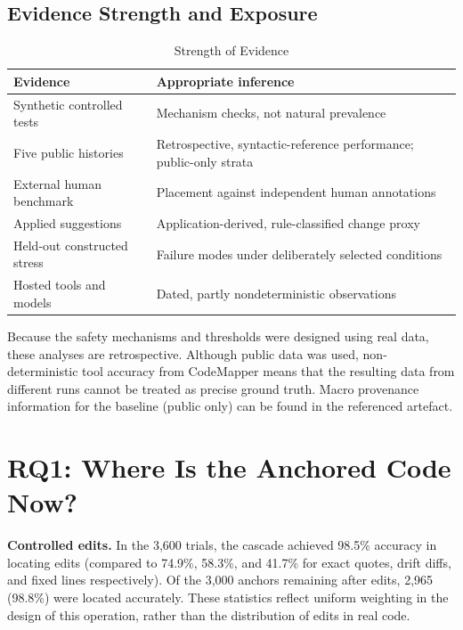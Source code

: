 \documentclass[10pt,conference,letterpaper]{IEEEtran}
\begin{document}
\subsection{Evidence Strength and Exposure}
\begin{table}[!t]
\caption{Strength of Evidence}
\label{tab:evidence-tiers}
\centering\footnotesize\setlength{\tabcolsep}{3pt}
\begin{tabularx}{\columnwidth}{>{\raggedright\arraybackslash}p{}X}
\hline
Evidence & Appropriate inference \\
\hline
Synthetic controlled tests & Mechanism checks, not natural prevalence \\
Five public histories & Retrospective, syntactic-reference performance; public-only strata \\
External human benchmark & Placement against independent human annotations \\
Applied suggestions & Application-derived, rule-classified change proxy \\
Held-out constructed stress & Failure modes under deliberately selected conditions \\
Hosted tools and models & Dated, partly nondeterministic observations \\
\hline
\end{tabularx}
\end{table}

Because the safety mechanisms and thresholds were designed using real data, these analyses are retrospective. Although public data was used, non-deterministic tool accuracy from CodeMapper means that the resulting data from different runs cannot be treated as precise ground truth. Macro provenance information for the baseline (public only) can be found in the referenced artefact.

\section{RQ1: Where Is the Anchored Code Now?}
\textbf{Controlled edits.} In the 3,600 trials, the cascade achieved 98.5\% accuracy in locating edits (compared to 74.9\%, 58.3\%, and 41.7\% for exact quotes, drift diffs, and fixed lines respectively). Of the 3,000 anchors remaining after edits, 2,965 (98.8\%) were located accurately. These statistics reflect uniform weighting in the design of this operation, rather than the distribution of edits in real code.
\end{document}
